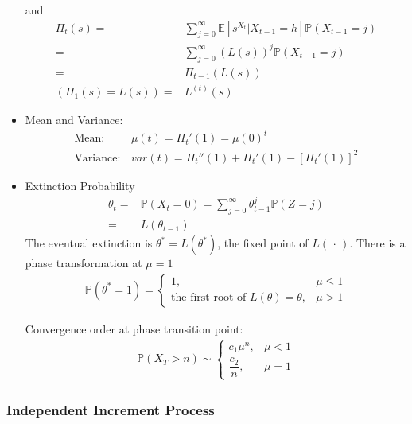 \begin{itemize}[topsep=2pt,itemsep=0pt]
    and 
    \begin{align*}
        \Pi_t(s)=&\sum_{j=0}^\infty \mathbb{E}\left[ s^{X_t}|X_{t-1}=h \right] \mathbb{P}\left( X_{t-1}=j \right) \\
        =&\sum_{j=0}^\infty \left(L(s)\right)^{j}\mathbb{P}\left( X_{t-1}=j \right) \\
        =&\Pi_{t-1}\left(L(s)\right)\\
        (\Pi_1(s)=L(s))=&L^{(t)}(s) 
    \end{align*}
    \item Mean and Variance:
    \begin{align*}
        \text{Mean}:&\, \mu (t) = \Pi_t'(1)=\mu(0) ^t\\
        \text{Variance}:&\,var(t)=\Pi_t''(1)+\Pi_t'(1)-[\Pi_t'(1)]^2
    \end{align*}
    \item Extinction Probability
    \begin{align*}
        \theta _t=&\mathbb{P}\left( X_t=0 \right)= \sum_{j=0}^\infty \theta ^j_{t-1}\mathbb{P}\left( Z=j \right) \\=
        &L(\theta _{t-1})
    \end{align*}
    The eventual extinction is $ \theta ^*=L(\theta ^*) $, the fixed point of $ L(\, \cdot \, ) $.
    There is a phase transformation at $ \mu = 1 $
    \begin{align*}
        \mathbb{P}\left( \theta ^*=1 \right) =\begin{cases}
            1,&\mu \leq 1\\
            \text{the first root of }L(\theta )=\theta ,& \mu >1
        \end{cases} 
    \end{align*}
    
    Convergence order at phase transition point:
    \begin{align*}
        \mathbb{P}\left( X_T>n \right) \sim \begin{cases}
            c_1\mu ^n,&\mu <1\\
            \dfrac{c_2}{n},&\mu =1
        \end{cases}  
    \end{align*}
     
\end{itemize}

    
\subsubsection{Independent Increment Process}\label{SubSubSectionIndepedentProcess}

